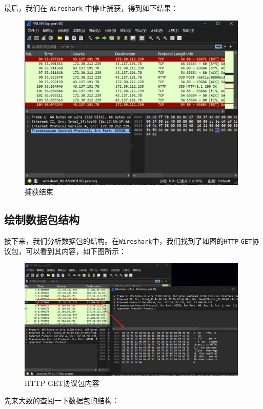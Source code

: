 \documentclass{article}
\begin{document}
	最后，我们在 \texttt{Wireshark} 中停止捕获，得到如下结果：
	
	\begin{figure}[H]
		\centering
		\includegraphics[width=11cm]{images/5.捕获结束.png}
		\caption{捕获结束}
	\end{figure}
	
	\subsection{绘制数据包结构}
	
	接下来，我们分析数据包的结构。在\texttt{Wireshark}中，我们找到了如图的\texttt{HTTP} \texttt{GET}协议包，可以看到其内容，如下图所示：
	
	\begin{figure}[H]
		\centering
		\includegraphics[width=11cm]{images/6.绘制数据包.png}
		\caption{HTTP GET协议包内容}
	\end{figure}
	
	先来大致的查阅一下数据包的结构：
	
\end{document}
